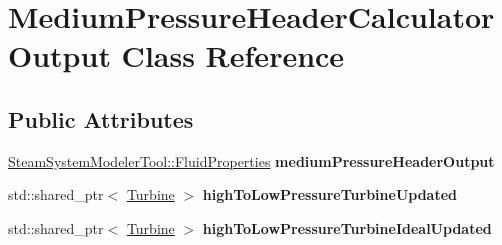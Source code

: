 \hypertarget{class_medium_pressure_header_calculator_output}{}\section{Medium\+Pressure\+Header\+Calculator\+Output Class Reference}
\label{class_medium_pressure_header_calculator_output}
\subsection*{Public Attributes}
\begin{DoxyCompactItemize}
\item 
\mbox{\label{class_medium_pressure_header_calculator_output_a21a0ab5019f871e9e7b601595b5bc646}} 
\hyperlink{struct_steam_system_modeler_tool_1_1_fluid_properties}{Steam\+System\+Modeler\+Tool\+::\+Fluid\+Properties} {\bfseries medium\+Pressure\+Header\+Output}
\item 
\mbox{\label{class_medium_pressure_header_calculator_output_af10b62471ecd99ef0a17b863d6b7cfef}} 
std\+::shared\+\_\+ptr$<$ \hyperlink{class_turbine}{Turbine} $>$ {\bfseries high\+To\+Low\+Pressure\+Turbine\+Updated}
\item 
\mbox{\label{class_medium_pressure_header_calculator_output_af9846ea65727bd14a956ef95caa5afdb}} 
std\+::shared\+\_\+ptr$<$ \hyperlink{class_turbine}{Turbine} $>$ {\bfseries high\+To\+Low\+Pressure\+Turbine\+Ideal\+Updated}
\end{DoxyCompactItemize}

